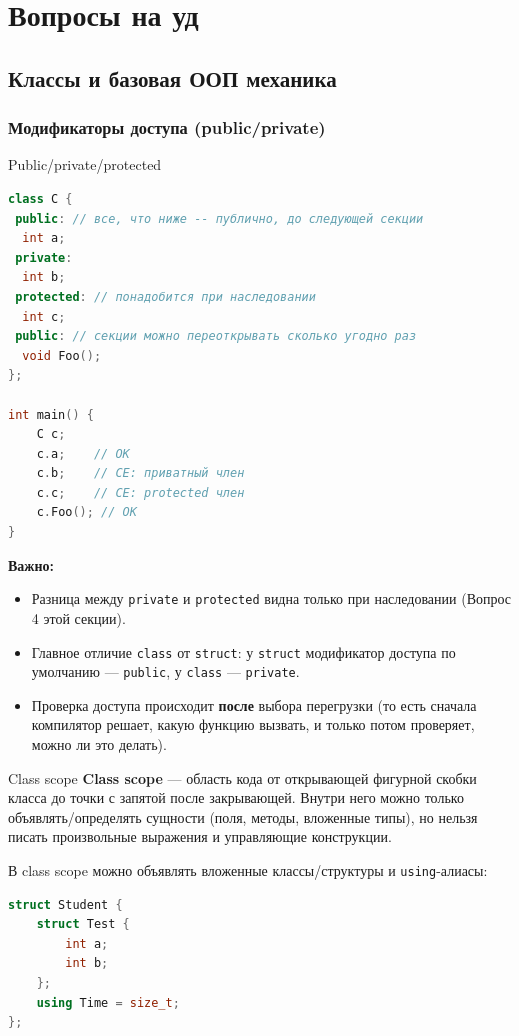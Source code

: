 
\section{Вопросы на уд}

\subsection{Классы и базовая ООП механика}
\subsubsection{Модификаторы доступа (public/private)}
\begin{implementation}{Public/private/protected}{}
\begin{lstlisting}[language=C++]
class C {
 public: // все, что ниже -- публично, до следующей секции
  int a;
 private:
  int b;
 protected: // понадобится при наследовании
  int c;
 public: // секции можно переоткрывать сколько угодно раз
  void Foo();
};

int main() {
    C c;
    c.a;    // OK
    c.b;    // CE: приватный член
    c.c;    // CE: protected член
    c.Foo(); // OK
}
\end{lstlisting}
\end{implementation}
\textbf{Важно:}
\begin{itemize}
  \item Разница между \texttt{private} и \texttt{protected} видна только при наследовании (Вопрос 4 этой секции).
  \item Главное отличие \texttt{class} от \texttt{struct}: у \texttt{struct} модификатор доступа по умолчанию --- \texttt{public}, у \texttt{class} --- \texttt{private}.
  \item Проверка доступа происходит \textbf{после} выбора перегрузки (то есть сначала компилятор решает, какую функцию вызвать, и только потом проверяет, можно ли это делать).
\end{itemize}
\begin{definition}{Class scope}{}
\textbf{Class scope} --- область кода от открывающей фигурной скобки класса до точки с запятой после закрывающей. Внутри него можно только объявлять/определять сущности (поля, методы, вложенные типы), но нельзя писать произвольные выражения и управляющие конструкции.
\end{definition}
В class scope можно объявлять вложенные классы/структуры и \texttt{using}-алиасы:
\begin{lstlisting}[language=C++]
struct Student {
    struct Test {
        int a;
        int b;
    };
    using Time = size_t;
};
\end{lstlisting}
